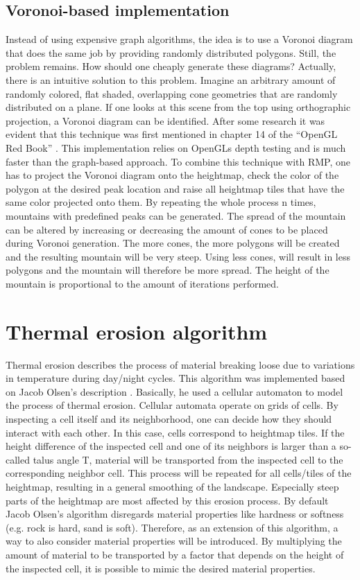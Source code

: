 \documentclass[11pt,a4paper,twoside,openright]{report}
\begin{document}
\subsection{Voronoi-based implementation}
Instead of using expensive graph algorithms, the idea is to use a Voronoi diagram that does the same job by providing randomly distributed polygons. Still, the problem remains. How should one cheaply generate these diagrams? Actually, there is an intuitive solution to this problem. Imagine an arbitrary amount of randomly colored, flat shaded, overlapping cone geometries that are randomly distributed on a plane. If one looks at this scene from the top using orthographic projection, a Voronoi diagram can be identified. After some research it was evident that this technique was first mentioned in chapter 14 of the ``OpenGL Red Book'' \cite{Woo:1999:OPG:554539}. This implementation relies on OpenGLs depth testing and is much faster than the graph-based approach. To combine this technique with RMP, one has to project the Voronoi diagram onto the heightmap, check the color of the polygon at the desired peak location and raise all heightmap tiles that have the same color projected onto them. By repeating the whole process n times, mountains with predefined peaks can be generated. The spread of the mountain can be altered by increasing or decreasing the amount of cones to be placed during Voronoi generation. The more cones, the more polygons will be created and the resulting mountain will be very steep. Using less cones, will result in less polygons and the mountain will therefore be more spread. The height of the mountain is proportional to the amount of iterations performed.

\section{Thermal erosion algorithm}
Thermal erosion describes the process of material breaking loose due to variations in temperature during day/night cycles. This algorithm was implemented based on Jacob Olsen's description \cite{Olsen:2004}. Basically, he used a cellular automaton to model the process of thermal erosion. Cellular automata operate on grids of cells. By inspecting a cell itself and its neighborhood, one can decide how they should interact with each other. In this case, cells correspond to heightmap tiles. If the height difference of the inspected cell and one of its neighbors is larger than a so-called talus angle T, material will be transported from the inspected cell to the corresponding neighbor cell. This process will be repeated for all cells/tiles of the heightmap, resulting in a general smoothing of the landscape. Especially steep parts of the heightmap are most affected by this erosion process. By default Jacob Olsen's algorithm disregards material properties like hardness or softness (e.g. rock is hard, sand is soft). Therefore, as an extension of this algorithm, a way to also consider material properties will be introduced. By multiplying the amount of material to be transported by a factor that depends on the height of the inspected cell, it is possible to mimic the desired material properties.
\end{document}
